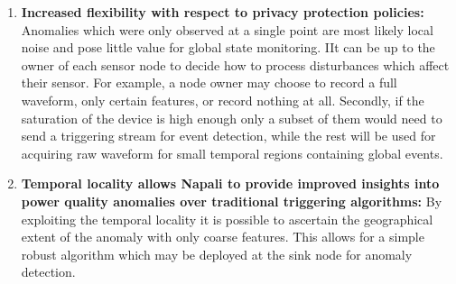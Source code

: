 \begin{enumerate}
    \item \textbf{Increased flexibility with respect to privacy protection policies:} Anomalies which were only observed at a single point are most likely local noise and pose little value for global state monitoring.
    IIt can be up to the owner of each sensor node to decide how to process disturbances which affect their sensor.
    For example, a node owner may choose to record a full waveform, only certain features, or record nothing at all.
    Secondly, if the saturation of the device is high enough only a subset of them would need to send a triggering stream for event detection, while the rest will be used for acquiring raw waveform for small temporal regions containing global events.

    \item \textbf{Temporal locality allows Napali to provide improved insights into power quality anomalies over traditional triggering algorithms:} By exploiting the temporal locality it is possible to ascertain the geographical extent of the anomaly with only coarse features.
    This allows for a simple robust algorithm which may be deployed at the sink node for anomaly detection.
\end{enumerate}

